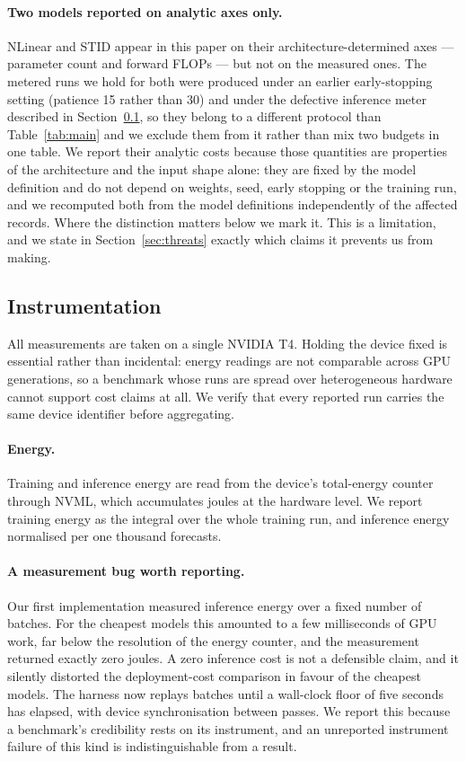 \documentclass[manuscript,screen,review]{acmart}
\begin{document}
\paragraph{Two models reported on analytic axes only.} NLinear and STID
appear in this paper on their architecture-determined axes --- parameter
count and forward FLOPs --- but not on the measured ones. The metered runs
we hold for both were produced under an earlier early-stopping setting
(patience 15 rather than 30) and under the defective inference meter
described in Section~\ref{sec:instr}, so they belong to a different
protocol than Table~\ref{tab:main} and we exclude them from it rather than
mix two budgets in one table. We report their analytic costs because those
quantities are properties of the architecture and the input shape alone:
they are fixed by the model definition and do not depend on weights, seed,
early stopping or the training run, and we recomputed both from the model
definitions independently of the affected records. Where the distinction
matters below we mark it. This is a limitation, and we state in
Section~\ref{sec:threats} exactly which claims it prevents us from making.

\subsection{Instrumentation}
\label{sec:instr}
All measurements are taken on a single NVIDIA T4. Holding the device fixed
is essential rather than incidental: energy readings are not comparable
across GPU generations, so a benchmark whose runs are spread over
heterogeneous hardware cannot support cost claims at all. We verify that
every reported run carries the same device identifier before aggregating.

\paragraph{Energy.} Training and inference energy are read from the
device's total-energy counter through NVML, which accumulates joules at the
hardware level. We report training energy as the integral over the whole
training run, and inference energy normalised per one thousand forecasts.

\paragraph{A measurement bug worth reporting.} Our first implementation
measured inference energy over a fixed number of batches. For the cheapest
models this amounted to a few milliseconds of GPU work, far below the
resolution of the energy counter, and the measurement returned exactly
zero joules. A zero inference cost is not a defensible claim, and it
silently distorted the deployment-cost comparison in favour of the
cheapest models. The harness now replays batches until a wall-clock floor
of five seconds has elapsed, with device synchronisation between passes.
We report this because a benchmark's credibility rests on its instrument,
and an unreported instrument failure of this kind is indistinguishable
from a result.
\end{document}
